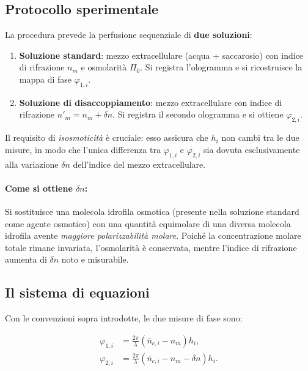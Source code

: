 \subsection{Protocollo sperimentale}

La procedura prevede la perfusione sequenziale di \textbf{due soluzioni}:

\begin{enumerate}
  \item \textbf{Soluzione standard}: mezzo extracellulare (acqua + saccarosio) con indice di rifrazione
        $n_m$ e osmolarità $\Pi_0$. Si registra l'ologramma e si ricostruisce la
        mappa di fase $\varphi_{1,i}$.

  \item \textbf{Soluzione di disaccoppiamento}: mezzo extracellulare con indice di
        rifrazione $n'_m = n_m + \delta n$. Si registra il secondo ologramma e si ottiene $\varphi_{2,i}$.
\end{enumerate}

Il requisito di \textit{isosmoticità} è cruciale: esso assicura che $h_i$ non cambi tra le
due misure, in modo che l'unica differenza tra $\varphi_{1,i}$ e $\varphi_{2,i}$
sia dovuta esclusivamente alla variazione $\delta n$ dell'indice del mezzo
extracellulare.

\paragraph{Come si ottiene $\delta n$:}
Si sostituisce una molecola idrofila osmotica (presente nella soluzione standard
come agente osmotico) con una quantità equimolare di una diversa molecola idrofila
avente \emph{maggiore polarizzabilità molare}. Poiché la concentrazione molare
totale rimane invariata, l'osmolarità è conservata, mentre l'indice di rifrazione
aumenta di $\delta n$ noto e misurabile.

\subsection{Il sistema di equazioni}

Con le convenzioni sopra introdotte, le due misure di fase sono:

\begin{align}
  \varphi_{1,i} &= \frac{2\pi}{\lambda}\left(\bar{n}_{c,i} - n_m\right)h_i,
  \label{eq:phi1} \\[6pt]
  \varphi_{2,i} &= \frac{2\pi}{\lambda}\left(\bar{n}_{c,i} - n_m - \delta n\right)h_i.
  \label{eq:phi2}
\end{align}

